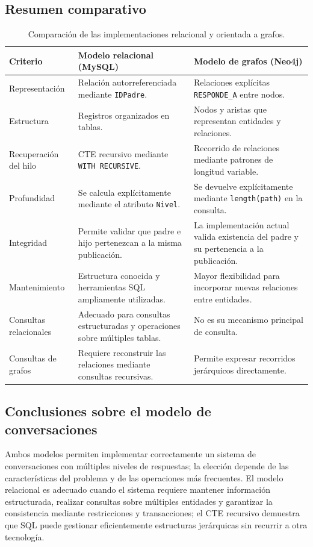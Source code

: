 \documentclass[11pt, a4paper]{article}
\begin{document}
\subsection{Resumen comparativo}
\begin{table}[H]
\centering
\small
\begin{tabular}{
    |>{\raggedright\arraybackslash}p{2.8cm}
    |>{\raggedright\arraybackslash}p{5.3cm}
    |>{\raggedright\arraybackslash}p{5.3cm}|
}
\hline
\textbf{Criterio} & \textbf{Modelo relacional (MySQL)} & \textbf{Modelo de grafos (Neo4j)} \\
\hline
Representación & Relación autorreferenciada mediante \texttt{IDPadre}. & Relaciones explícitas \texttt{RESPONDE\_A} entre nodos. \\
\hline
Estructura & Registros organizados en tablas. & Nodos y aristas que representan entidades y relaciones. \\
\hline
Recuperación del hilo & CTE recursivo mediante \texttt{WITH RECURSIVE}. & Recorrido de relaciones mediante patrones de longitud variable. \\
\hline
Profundidad & Se calcula explícitamente mediante el atributo \texttt{Nivel}. & Se devuelve explícitamente mediante \texttt{length(path)} en la consulta. \\
\hline
Integridad & Permite validar que padre e hijo pertenezcan a la misma publicación. & La implementación actual valida existencia del padre y su pertenencia a la publicación. \\
\hline
Mantenimiento & Estructura conocida y herramientas SQL ampliamente utilizadas. & Mayor flexibilidad para incorporar nuevas relaciones entre entidades. \\
\hline
Consultas relacionales & Adecuado para consultas estructuradas y operaciones sobre múltiples tablas. & No es su mecanismo principal de consulta. \\
\hline
Consultas de grafos & Requiere reconstruir las relaciones mediante consultas recursivas. & Permite expresar recorridos jerárquicos directamente. \\
\hline
\end{tabular}
\caption{Comparación de las implementaciones relacional y orientada a grafos.}
\label{tab:comparacion-modelos}
\end{table}

\subsection{Conclusiones sobre el modelo de conversaciones}
Ambos modelos permiten implementar correctamente un sistema de conversaciones con múltiples niveles de respuestas; la elección depende de las características del problema y de las operaciones más frecuentes. El modelo relacional es adecuado cuando el sistema requiere mantener información estructurada, realizar consultas sobre múltiples entidades y garantizar la consistencia mediante restricciones y transacciones; el CTE recursivo demuestra que SQL puede gestionar eficientemente estructuras jerárquicas sin recurrir a otra tecnología.
\end{document}
